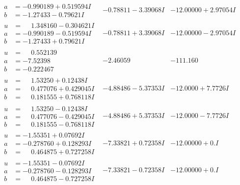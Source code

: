 \documentclass[1p]{elsarticle_modified}
\theoremstyle{definition}
\begin{document}
$$\begin{array}{c|c|c}
\begin{aligned}
a &= -0.990189 + 0.519594 I \\
b &= -1.27433 - 0.79621 I\end{aligned}
 & -0.78811 - 3.39068 I & -12.00000 + 2.97054 I \\ \hline\begin{aligned}
u &= \phantom{-}1.348160 - 0.304621 I \\
a &= -0.990189 - 0.519594 I \\
b &= -1.27433 + 0.79621 I\end{aligned}
 & -0.78811 + 3.39068 I & -12.00000 - 2.97054 I \\ \hline\begin{aligned}
u &= \phantom{-}0.552139\phantom{ +0.000000I} \\
a &= -7.52398\phantom{ +0.000000I} \\
b &= -0.222467\phantom{ +0.000000I}\end{aligned}
 & -2.46059\phantom{ +0.000000I} & -111.160\phantom{ +0.000000I} \\ \hline\begin{aligned}
u &= \phantom{-}1.53250 + 0.12438 I \\
a &= \phantom{-}0.477076 + 0.429045 I \\
b &= \phantom{-}0.181555 + 0.768118 I\end{aligned}
 & -4.88486 - 5.37353 I & -12.0000 + 7.7726 I \\ \hline\begin{aligned}
u &= \phantom{-}1.53250 - 0.12438 I \\
a &= \phantom{-}0.477076 - 0.429045 I \\
b &= \phantom{-}0.181555 - 0.768118 I\end{aligned}
 & -4.88486 + 5.37353 I & -12.0000 - 7.7726 I \\ \hline\begin{aligned}
u &= -1.55351 + 0.07692 I \\
a &= -0.278760 + 0.128293 I \\
b &= \phantom{-}0.464875 + 0.727258 I\end{aligned}
 & -7.33821 + 0.72358 I & -12.00000 + 0. I\phantom{ +0.000000I} \\ \hline\begin{aligned}
u &= -1.55351 - 0.07692 I \\
a &= -0.278760 - 0.128293 I \\
b &= \phantom{-}0.464875 - 0.727258 I\end{aligned}
 & -7.33821 - 0.72358 I & -12.00000 + 0. I\phantom{ +0.000000I} \\ \hline\begin{aligned}

\end{aligned}
\end{array}$$
\end{document}
